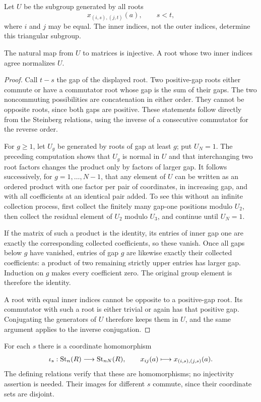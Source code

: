Let $U$ be the subgroup generated by all roots
\[
 x_{(i,s),(j,t)}(a),\qquad s<t,
\]
where $i$ and $j$ may be equal.  The inner indices, not the outer
indices, determine this triangular subgroup.

\begin{lemma}\label{kt:triangular-faithfulness}
The natural map from $U$ to matrices is injective.  A root whose
two inner indices agree normalizes $U$.
\end{lemma}

\begin{proof}
Call $t-s$ the gap of the displayed root.  Two positive-gap roots
either commute or have a commutator root whose gap is the sum of
their gaps.  The two noncommuting possibilities are concatenation
in either order.  They cannot be opposite roots, since both gaps
are positive.  These statements follow directly from the
Steinberg relations, using the inverse of a consecutive commutator
for the reverse order.

For $g\geq 1$, let $U_g$ be generated by roots of gap at least $g$;
put $U_N=1$.  The preceding computation shows that $U_g$ is normal
in $U$ and that interchanging two root factors changes the product
only by factors of larger gap.  It follows successively, for
$g=1,\ldots,N-1$, that any element of $U$ can be written as an
ordered product with one factor per pair of coordinates, in
increasing gap, and with all coefficients at an identical pair
added.  To see this without an infinite collection process, first
collect the finitely many gap-one positions modulo $U_2$, then
collect the residual element of $U_2$ modulo $U_3$, and continue
until $U_N=1$.

If the matrix of such a product is the identity, its entries of
inner gap one are exactly the corresponding collected coefficients,
so these vanish.  Once all gaps below $g$ have vanished, entries of
gap $g$ are likewise exactly their collected coefficients: a product
of two remaining strictly upper entries has larger gap.  Induction
on $g$ makes every coefficient zero.  The original group element
is therefore the identity.

A root with equal inner indices cannot be opposite to a positive-gap
root.  Its commutator with such a root is either trivial or again
has that positive gap.  Conjugating the generators of $U$ therefore
keeps them in $U$, and the same argument applies to the inverse
conjugation.
\end{proof}

For each $s$ there is a coordinate homomorphism
\[
 \iota_s:\operatorname{St}_n(R)\longrightarrow\operatorname{St}_{nN}(R),\qquad
 x_{ij}(a)\longmapsto x_{(i,s),(j,s)}(a).
\]
The defining relations verify that these are homomorphisms; no
injectivity assertion is needed.  Their images for different $s$
commute, since their coordinate sets are disjoint.

